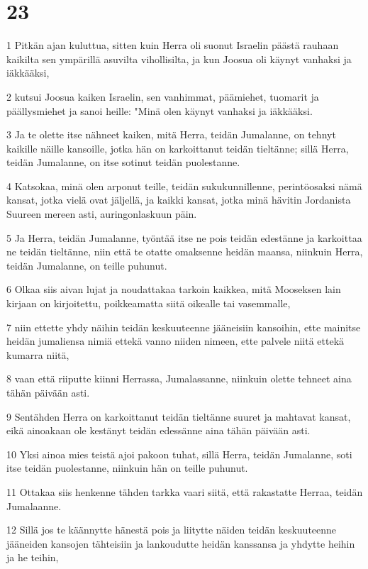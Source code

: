 \chapter{23}

\par 1 Pitkän ajan kuluttua, sitten kuin Herra oli suonut Israelin päästä rauhaan kaikilta sen ympärillä asuvilta vihollisilta, ja kun Joosua oli käynyt vanhaksi ja iäkkääksi,
\par 2 kutsui Joosua kaiken Israelin, sen vanhimmat, päämiehet, tuomarit ja päällysmiehet ja sanoi heille: "Minä olen käynyt vanhaksi ja iäkkääksi.
\par 3 Ja te olette itse nähneet kaiken, mitä Herra, teidän Jumalanne, on tehnyt kaikille näille kansoille, jotka hän on karkoittanut teidän tieltänne; sillä Herra, teidän Jumalanne, on itse sotinut teidän puolestanne.
\par 4 Katsokaa, minä olen arponut teille, teidän sukukunnillenne, perintöosaksi nämä kansat, jotka vielä ovat jäljellä, ja kaikki kansat, jotka minä hävitin Jordanista Suureen mereen asti, auringonlaskuun päin.
\par 5 Ja Herra, teidän Jumalanne, työntää itse ne pois teidän edestänne ja karkoittaa ne teidän tieltänne, niin että te otatte omaksenne heidän maansa, niinkuin Herra, teidän Jumalanne, on teille puhunut.
\par 6 Olkaa siis aivan lujat ja noudattakaa tarkoin kaikkea, mitä Mooseksen lain kirjaan on kirjoitettu, poikkeamatta siitä oikealle tai vasemmalle,
\par 7 niin ettette yhdy näihin teidän keskuuteenne jääneisiin kansoihin, ette mainitse heidän jumaliensa nimiä ettekä vanno niiden nimeen, ette palvele niitä ettekä kumarra niitä,
\par 8 vaan että riiputte kiinni Herrassa, Jumalassanne, niinkuin olette tehneet aina tähän päivään asti.
\par 9 Sentähden Herra on karkoittanut teidän tieltänne suuret ja mahtavat kansat, eikä ainoakaan ole kestänyt teidän edessänne aina tähän päivään asti.
\par 10 Yksi ainoa mies teistä ajoi pakoon tuhat, sillä Herra, teidän Jumalanne, soti itse teidän puolestanne, niinkuin hän on teille puhunut.
\par 11 Ottakaa siis henkenne tähden tarkka vaari siitä, että rakastatte Herraa, teidän Jumalaanne.
\par 12 Sillä jos te käännytte hänestä pois ja liitytte näiden teidän keskuuteenne jääneiden kansojen tähteisiin ja lankoudutte heidän kanssansa ja yhdytte heihin ja he teihin,
